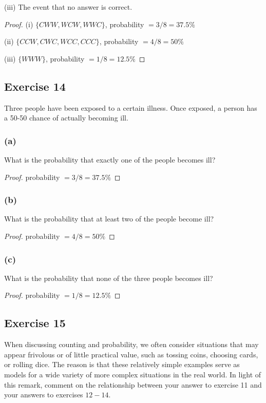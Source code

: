 \documentclass[14pt]{extarticle}
\begin{document}
(iii) The event that no answer is correct.

\begin{proof}
     (i) \(\{CWW, WCW, WWC\}\), probability \(= 3/8 = 37.5\%\)

     (ii) \(\{CCW, CWC, WCC, CCC\}\), probability \(= 4/8 = 50\%\)

     (iii) \(\{WWW\}\), probability \(= 1/8 = 12.5\%\)
\end{proof}

\subsection{Exercise 14}
Three people have been exposed to a certain illness. Once exposed, a person has a 50-50 chance of actually becoming ill.

\subsubsection{(a)}
What is the probability that exactly one of the people becomes ill?

\begin{proof}
     probability \(= 3/8 = 37.5\%\)
\end{proof}

\subsubsection{(b)}
What is the probability that at least two of the people become ill?

\begin{proof}
     probability \(= 4/8 = 50\%\)
\end{proof}

\subsubsection{(c)}
What is the probability that none of the three people becomes ill?

\begin{proof}
     probability \(= 1/8 = 12.5\%\)
\end{proof}

\subsection{Exercise 15}
When discussing counting and probability, we often consider situations that may appear frivolous or of little practical
value, such as tossing coins, choosing cards, or rolling dice. The reason is that these relatively simple examples
serve as models for a wide variety of more complex situations in the real world. In light of this remark,
comment on the relationship between your answer to exercise 11 and your answers to exercises $12-14$.
\end{document}
